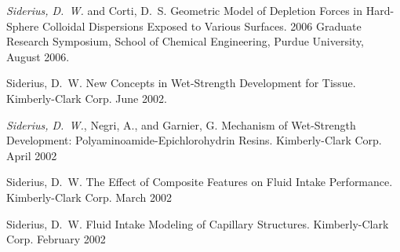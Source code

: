 {\it Siderius, D.~W.} and Corti, D.~S. Geometric Model of Depletion Forces in Hard-Sphere Colloidal Dispersions Exposed to Various Surfaces. 2006 Graduate Research Symposium, School of Chemical Engineering, Purdue University, August 2006.

Siderius, D.~W. New Concepts in Wet-Strength Development for Tissue. Kimberly-Clark Corp. June 2002.

{\it Siderius, D.~W.}, Negri, A., and Garnier, G. Mechanism of Wet-Strength Development: Polyaminoamide-Epichlorohydrin Resins. Kimberly-Clark Corp. April 2002

Siderius, D.~W. The Effect of Composite Features on Fluid Intake Performance. Kimberly-Clark Corp. March 2002

Siderius, D.~W. Fluid Intake Modeling of Capillary Structures. Kimberly-Clark Corp. February 2002
